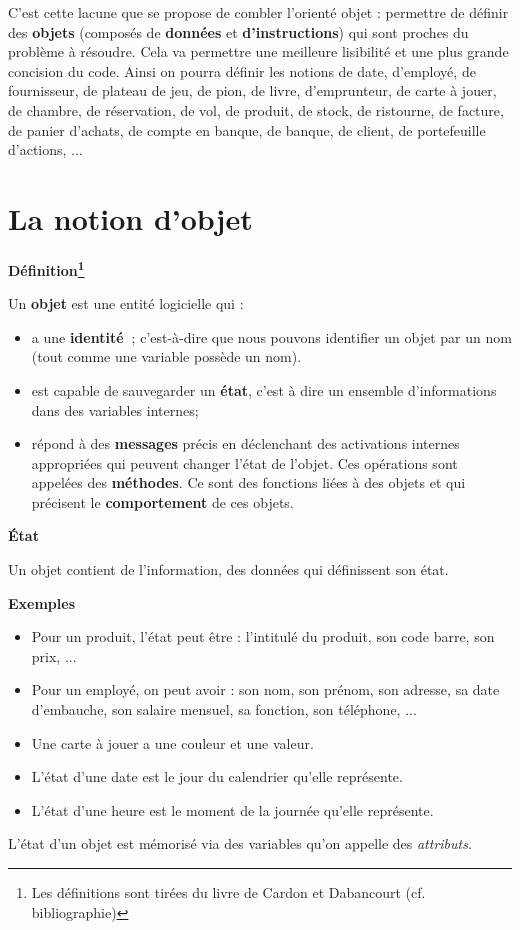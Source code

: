 {
C'est cette lacune que se propose de combler
l'orienté objet : permettre de définir des
\textbf{objets} (composés de \textbf{données} et
\textbf{d'instructions}) qui sont proches du problème
à résoudre. Cela va permettre une meilleure lisibilité et une plus
grande concision du code. Ainsi on pourra définir les notions de date,
d'employé, de fournisseur, de plateau de jeu, de pion,
de livre, d'emprunteur, de carte à jouer, de chambre,
de réservation, de vol, de produit, de stock, de ristourne, de facture,
de panier d'achats, de compte en banque, de banque, de
client, de portefeuille d'actions, ...}

\section{La notion d'objet}
{\sffamily\bfseries\upshape
Définition\footnote{Les définitions sont tirées du livre de Cardon et
Dabancourt (cf. bibliographie)}}

{
Un \textbf{objet} est une entité logicielle qui :}

\liststyleListi
\begin{itemize}
\item {
a une \textbf{identité~}; c'est-à-dire que nous pouvons
identifier un objet par un nom (tout comme une variable possède un
nom).}
\item {
est capable de sauvegarder un \textbf{état}, c'est à
dire un ensemble d'informations dans des variables
internes;}
\item {
répond à des \textbf{messages} précis en déclenchant des activations
internes appropriées qui peuvent changer l'état de
l'objet. Ces opérations sont appelées des
\textbf{méthodes}. Ce sont des fonctions liées à des objets et qui
précisent le \textbf{comportement} de ces objets.}
\end{itemize}
{\sffamily\bfseries\upshape
État}

{
Un objet contient de l'information, des données qui
définissent son état. }

{\bfseries
Exemples}

\liststyleListv
\begin{itemize}
\item {
Pour un produit, l'état peut être :
l'intitulé du produit, son code barre, son prix, ... }
\item {
Pour un employé, on peut avoir : son nom, son prénom, son adresse, sa
date d'embauche, son salaire mensuel, sa fonction, son
téléphone, ... }
\item {
Une carte à jouer a une couleur et une valeur.}
\item {
L'état d'une date est le jour du
calendrier qu'elle représente.}
\item {
L'état d'une heure est le moment de la
journée qu'elle représente.}
\end{itemize}
{
L'état d'un objet est mémorisé via des
variables qu'on appelle des \textit{attributs}.}

